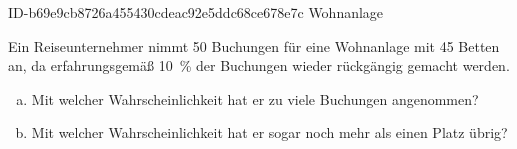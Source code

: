 \begin{exercise}
      {ID-b69e9cb8726a455430cdeac92e5ddc68ce678e7c}
      {Wohnanlage}
  \ifproblem\problem\par
    Ein Reiseunternehmer nimmt \num{50} Buchungen für
    eine Wohnanlage mit \num{45} Betten an, da
    erfahrungsgemäß \SI{10}{\percent} der Buchungen
    wieder rückgängig gemacht werden.
    \begin{enumerate}[a)]
      \item Mit welcher Wahrscheinlichkeit hat er zu
            viele Buchungen angenommen?
      \item Mit welcher Wahrscheinlichkeit hat er
            sogar noch mehr als einen Platz übrig?
    \end{enumerate}
  \fi
\end{exercise}
